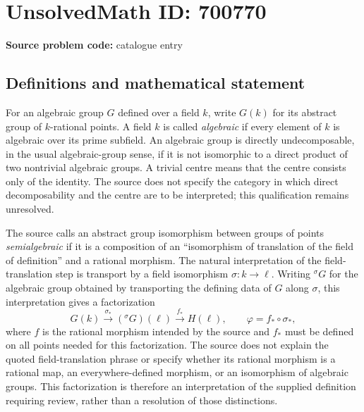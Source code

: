 \documentclass[11pt]{article}
\begin{document}
\section*{UnsolvedMath ID: 700770}
\textbf{Source problem code:} catalogue entry
\subsection{Definitions and mathematical statement}
For an algebraic group \(G\) defined over a field \(k\), write \(G(k)\) for its abstract group of \(k\)-rational points. A field \(k\) is called \emph{algebraic} if every element of \(k\) is algebraic over its prime subfield. An algebraic group is directly undecomposable, in the usual algebraic-group sense, if it is not isomorphic to a direct product of two nontrivial algebraic groups. A trivial centre means that the centre consists only of the identity. The source does not specify the category in which direct decomposability and the centre are to be interpreted; this qualification remains unresolved.

The source calls an abstract group isomorphism between groups of points \emph{semialgebraic} if it is a composition of an ``isomorphism of translation of the field of definition'' and a rational morphism. The natural interpretation of the field-translation step is transport by a field isomorphism \(\sigma:k\to\ell\). Writing \({}^{\sigma}G\) for the algebraic group obtained by transporting the defining data of \(G\) along \(\sigma\), this interpretation gives a factorization
\[
G(k)\xrightarrow{\sigma_*}({}^{\sigma}G)(\ell)\xrightarrow{f_*}H(\ell),
\qquad \varphi=f_*\circ\sigma_*,
\]
where \(f\) is the rational morphism intended by the source and \(f_*\) must be defined on all points needed for this factorization. The source does not explain the quoted field-translation phrase or specify whether its rational morphism is a rational map, an everywhere-defined morphism, or an isomorphism of algebraic groups. This factorization is therefore an interpretation of the supplied definition requiring review, rather than a resolution of those distinctions.
\end{document}
